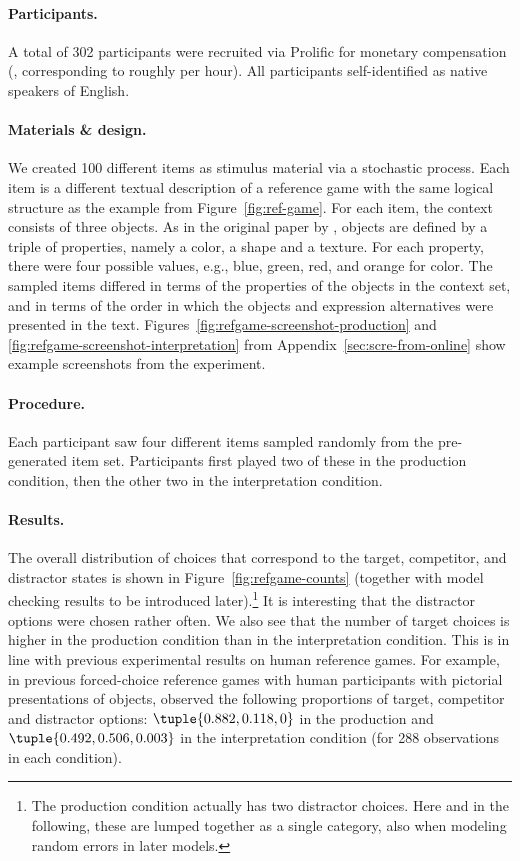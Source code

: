 \documentclass[fleqn]{article}
\begin{document}
\paragraph{Participants.}
A total of 302 participants were recruited via Prolific for monetary
compensation (, corresponding to roughly  per hour).
All participants self-identified as native speakers of English.

\paragraph{Materials \& design.}
We created 100 different items as stimulus material via a stochastic process.
Each item is a different textual description of a reference game with the same logical structure as the example from Figure~\ref{fig:ref-game}.
For each item, the context consists of three objects.
As in the original paper by \citet{FrankGoodman2012:Predicting-Prag}, objects are defined by a triple of properties, namely a color, a shape and a texture.
For each property, there were four possible values, e.g., blue, green, red, and orange for color.
The sampled items differed in terms of the properties of the objects in the context set, and in terms of the order in which the objects and expression alternatives were presented in the text.
Figures~\ref{fig:refgame-screenshot-production} and \ref{fig:refgame-screenshot-interpretation} from Appendix~\ref{sec:scre-from-online} show example screenshots from the experiment.

\paragraph{Procedure.}
Each participant saw four different items sampled randomly from the pre-generated item set.
Participants first played two of these in the production condition, then the other two in the interpretation condition.


\paragraph{Results.}
The overall distribution of choices that correspond to the target, competitor, and distractor states is shown in Figure~\ref{fig:refgame-counts} (together with model checking results to be introduced later).\footnote{
  The production condition actually has two distractor choices.
  Here and in the following, these are lumped together as a single category, also when modeling random errors in later models.
  }
It is interesting that the distractor options were chosen rather often.
We also see that the number of target choices is higher in the production condition than in the interpretation condition.
This is in line with previous experimental results on human reference games.
For example, in previous forced-choice reference games with human participants with pictorial presentations of objects, \citet{QingFranke2013:Variations-on-a} observed the following proportions of target, competitor and distractor options: $\tuple{0.882, 0.118, 0}$ in the production and $\tuple{0.492, 0.506, 0.003}$ in the interpretation condition (for 288 observations in each condition).
\end{document}
